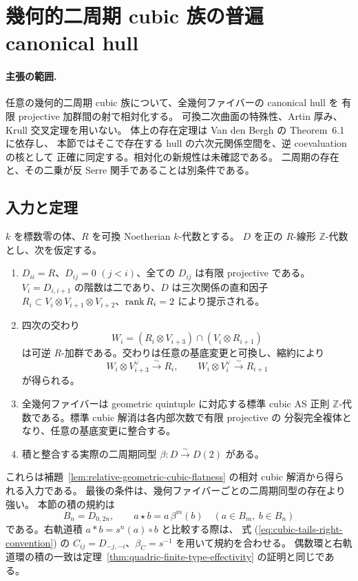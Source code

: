 \section{幾何的二周期 cubic 族の普遍 canonical hull}
\label{sec:universal-cubic-hull}
\paragraph{主張の範囲.}
任意の幾何的二周期 cubic 族について、全幾何ファイバーの canonical hull を
有限 projective 加群間の射で相対化する。
可換二次曲面の特殊性、Artin 厚み、Krull 交叉定理を用いない。
体上の存在定理は Van den Bergh の Theorem~6.1 に依存し、
本節ではそこで存在する hull の六次元関係空間を、逆 coevaluation の核として
正確に同定する。相対化の新規性は未確認である。
二周期の存在と、その二乗が反 Serre 関手であることは別条件である。

\subsection{入力と定理}

$k$ を標数零の体、$R$ を可換 Noetherian $k$-代数とする。
$D$ を正の $R$-線形 $\mathbb Z$-代数とし、次を仮定する。
\begin{enumerate}
\item $D_{ii}=R$、$D_{ij}=0$ $(j<i)$、全ての $D_{ij}$ は有限 projective である。
  $V_i=D_{i,i+1}$ の階数は二であり、$D$ は三次関係の直和因子
  $R_i\subset V_i\otimes V_{i+1}\otimes V_{i+2}$、$\operatorname{rank} R_i=2$ により提示される。
\item 四次の交わり
  \[
  W_i=(R_i\otimes V_{i+3})\cap(V_i\otimes R_{i+1})
  \]
  は可逆 $R$-加群である。交わりは任意の基底変更と可換し、縮約により
  \[
  W_i\otimes V_{i+3}^{\vee}\xrightarrow{\sim}R_i,
  \qquad W_i\otimes V_i^{\vee}\xrightarrow{\sim}R_{i+1}
  \tag{UH-1}\label{hull-eq:coevaluation}
  \]
  が得られる。
\item 全幾何ファイバーは geometric quintuple に対応する標準 cubic AS 正則
  $\mathbb Z$-代数である。標準 cubic 解消は各内部次数で有限 projective の
  分裂完全複体となり、任意の基底変更に整合する。
\item 積と整合する実際の二周期同型 $\beta:D\xrightarrow{\sim}D(2)$ がある。
\end{enumerate}
これらは補題~\ref{lem:relative-geometric-cubic-flatness} の相対 cubic 解消から得られる入力である。
最後の条件は、幾何ファイバーごとの二周期同型の存在より強い。
本節の積の規約は
\[
 B_n=D_{0,2n},\qquad a\star b=a\,\beta^m(b)
 \quad(a\in B_m,\ b\in B_n)
 \tag{UH-2}\label{hull-eq:product}
\]
である。右軌道積 $a*b=s^n(a)\circ b$ と比較する際は、
式 (\ref{eq:cubic-tails-right-convention}) の
$C_{ij}=D_{-j,-i}$、$\beta_C=s^{-1}$ を用いて規約を合わせる。
偶数環と右軌道環の積の一致は定理~\ref{thm:quadric-finite-type-effectivity} の証明と同じである。

